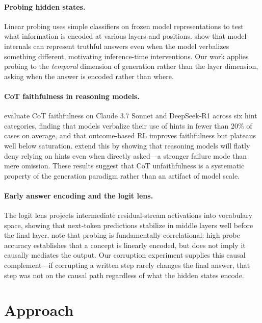 \documentclass[11pt]{article}
\begin{document}
\paragraph{Probing hidden states.}
Linear probing \cite{belinkov2022probing} uses simple classifiers on frozen model representations to test what information is encoded at various layers and positions. \citet{li2024inference} show that model internals can represent truthful answers even when the model verbalizes something different, motivating inference-time interventions. Our work applies probing to the \textit{temporal} dimension of generation rather than the layer dimension, asking when the answer is encoded rather than where.

\paragraph{CoT faithfulness in reasoning models.}
\citet{chen2025reasoning} evaluate CoT faithfulness on Claude 3.7 Sonnet and DeepSeek-R1 across six hint categories, finding that models verbalize their use of hints in fewer than 20\% of cases on average, and that outcome-based RL improves faithfulness but plateaus well below saturation. \citet{walden2025reasoning} extend this by showing that reasoning models will flatly deny relying on hints even when directly asked---a stronger failure mode than mere omission. These results suggest that CoT unfaithfulness is a systematic property of the generation paradigm rather than an artifact of model scale.

\paragraph{Early answer encoding and the logit lens.}
The logit lens \cite{nostalgebraist2020logitlens} projects intermediate residual-stream activations into vocabulary space, showing that next-token predictions stabilize in middle layers well before the final layer. \citet{bereska2024mechanistic} note that probing is fundamentally correlational: high probe accuracy establishes that a concept is linearly encoded, but does not imply it causally mediates the output. Our corruption experiment supplies this causal complement---if corrupting a written step rarely changes the final answer, that step was not on the causal path regardless of what the hidden states encode.

\section{Approach}
\end{document}
